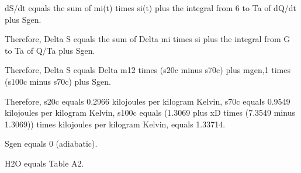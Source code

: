 dS/dt equals the sum of mi(t) times si(t) plus the integral from 6 to Ta of dQ/dt plus Sgen.

Therefore, Delta S equals the sum of Delta mi times si plus the integral from G to Ta of Q/Ta plus Sgen.

Therefore, Delta S equals Delta m12 times (s20c minus s70c) plus mgen,1 times (s100c minus s70c) plus Sgen.

Therefore, s20c equals 0.2966 kilojoules per kilogram Kelvin, s70c equals 0.9549 kilojoules per kilogram Kelvin, s100c equals (1.3069 plus xD times (7.3549 minus 1.3069)) times kilojoules per kilogram Kelvin, equals 1.33714.

Sgen equals 0 (adiabatic).

H2O equals Table A2.